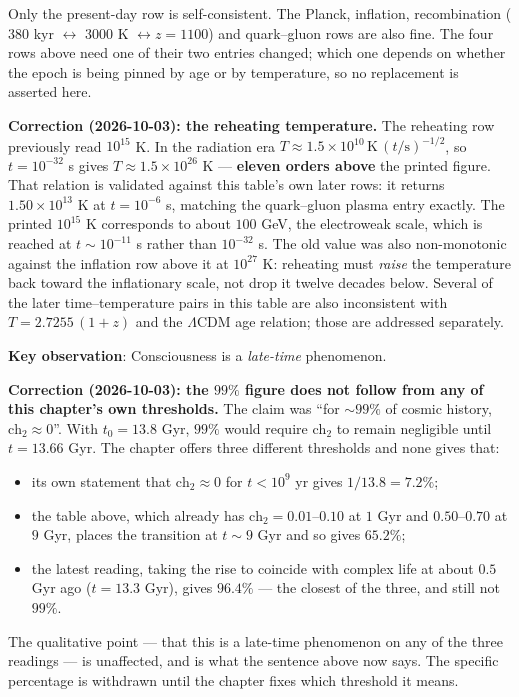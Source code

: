 \begin{level2}
\noindent Only the present-day row is self-consistent. The Planck, inflation,
recombination ($380$ kyr $\leftrightarrow$ $3000$ K $\leftrightarrow z = 1100$)
and quark--gluon rows are also fine. The four rows above need one of their two
entries changed; which one depends on whether the epoch is being pinned by age or
by temperature, so no replacement is asserted here.

\medskip
\noindent\textbf{Correction (2026-10-03): the reheating temperature.}
The reheating row previously read $10^{15}$ K. In the radiation era
$T \approx 1.5\times10^{10}\,\mathrm{K}\,(t/\mathrm{s})^{-1/2}$, so
$t = 10^{-32}$ s gives $T \approx 1.5\times10^{26}$ K --- \textbf{eleven
orders above} the printed figure. That relation is validated against this
table's own later rows: it returns $1.50\times10^{13}$ K at $t = 10^{-6}$ s,
matching the quark--gluon plasma entry exactly. The printed $10^{15}$ K
corresponds to about $100$ GeV, the electroweak scale, which is reached at
$t \sim 10^{-11}$ s rather than $10^{-32}$ s. The old value was also
non-monotonic against the inflation row above it at $10^{27}$ K: reheating
must \emph{raise} the temperature back toward the inflationary scale, not
drop it twelve decades below. Several of the later time--temperature pairs in
this table are also inconsistent with $T = 2.7255\,(1+z)$ and the
$\Lambda$CDM age relation; those are addressed separately.

\textbf{Key observation}: Consciousness is a \textit{late-time} phenomenon.

\medskip
\noindent\textbf{Correction (2026-10-03): the $99\%$ figure does not follow from
any of this chapter's own thresholds.}
The claim was ``for $\sim 99\%$ of cosmic history, $\text{ch}_2 \approx 0$''.
With $t_0 = 13.8$ Gyr, $99\%$ would require $\text{ch}_2$ to remain negligible
until $t = 13.66$ Gyr. The chapter offers three different thresholds and none
gives that:

\begin{itemize}
\item its own statement that $\text{ch}_2 \approx 0$ for $t < 10^9$ yr gives
  $1/13.8 = \mathbf{7.2\%}$;
\item the table above, which already has $\text{ch}_2 = 0.01$--$0.10$ at
  $1$ Gyr and $0.50$--$0.70$ at $9$ Gyr, places the transition at $t \sim 9$ Gyr
  and so gives $\mathbf{65.2\%}$;
\item the latest reading, taking the rise to coincide with complex life at about
  $0.5$ Gyr ago ($t = 13.3$ Gyr), gives $\mathbf{96.4\%}$ --- the closest of the
  three, and still not $99\%$.
\end{itemize}

\noindent The qualitative point --- that this is a late-time phenomenon on any of
the three readings --- is unaffected, and is what the sentence above now says. The
specific percentage is withdrawn until the chapter fixes which threshold it
means.
\end{level2}

